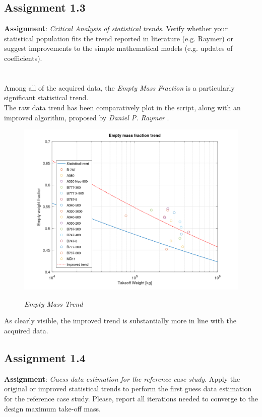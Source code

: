 \documentclass{article}
\begin{document}
\subsection{Assignment 1.3\label{Assignment_1.3}}
\textbf{Assignment}: \textit{Critical Analysis of statistical trends}.
Verify whether your statistical population fits the trend reported in
literature (e.g. Raymer) or suggest improvements to the simple
mathematical models (e.g. updates of coefficients).\\ \\ \\ 

Among all of the acquired data, the \textit{Empty Mass Fraction} is a particularly significant
statistical trend. \\
The raw data trend has been comparatively plot in the script, along with an improved algorithm, 
proposed by \textit{Daniel P. Raymer} \autocite{Raymer_Daniel}.

\begin{figure}[h!]
    \centering
    \includegraphics[width=\textwidth]{Sources/Plots_and_Pictures/Empty_mass_trend.png}\\
    \label{Empty_mass_trend}
    \caption{\textit{Empty Mass Trend}}
\end{figure} 

As clearly visible, the improved trend is substantially more in line with the acquired data.


\pagebreak
\subsection{Assignment 1.4\label{Assignments_1.4}}
\textbf{Assignment}: \textit{Guess data estimation for the reference
case study}. Apply the original or improved statistical trends to
perform the first guess data estimation for the reference case
study. Please, report all iterations needed to converge to the
design maximum take-off mass.\\ \\ \\ 
\end{document}
